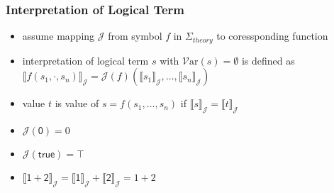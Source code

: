 \documentclass[12pt,aspectratio=169]{beamer}
\newcommand{\m}[1]{\mathsf{#1}}
\newcommand{\mi}[1]{\mathit{#1}}
\newcommand{\Var}{\mathcal{V}\mathrm{ar}}
\newcommand{\II}{\mathcal{I}}
\newcommand{\JJ}{\mathcal{J}}
\newcommand{\Stheory}{\Sigma_\mi{theory}}
\newcommand{\interpret}[1]{\llbracket #1 \rrbracket_\JJ}
\begin{document}
\begin{frame}
    \frametitle{Interpretation of Logical Term}
    \begin{definition}
        \pause
        \begin{itemize}
        \item assume mapping \alert{$\JJ$} from symbol $f$ in $\Stheory$ to coressponding function
        \item \alert{interpretation} of logical term $s$ with \alert{$\Var(s) = \emptyset$} is defined as
            $\interpret{f(s_1,\cdot,s_n)} = \JJ(f)(\interpret{s_1},\ldots,\interpret{s_n})$
        \item value $t$ is value of $s = f(s_1,\ldots,s_n)$  if
            $\interpret{s} = \interpret{t}$
        \end{itemize}
    \end{definition}
    
    \pause
    \begin{example}
        \begin{itemize}
            \item $\JJ(\m{0}) = 0$
            \pause
            \item $\JJ(\m{true}) = \top$
            \pause
            \item $\interpret{\m{1} + \m{2}} = \interpret{\m{1}} + \interpret{\m{2}} = 1 + 2$ 
        \end{itemize}
    \end{example}
\end{frame}
\end{document}
